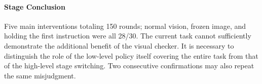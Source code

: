 
\paragraph{Stage Conclusion} Five main interventions totaling 150 rounds; normal vision, frozen image, and holding the first instruction were all 28/30. The current task cannot sufficiently demonstrate the additional benefit of the visual checker. It is necessary to distinguish the role of the low-level policy itself covering the entire task from that of the high-level stage switching. Two consecutive confirmations may also repeat the same misjudgment.


\FloatBarrier
